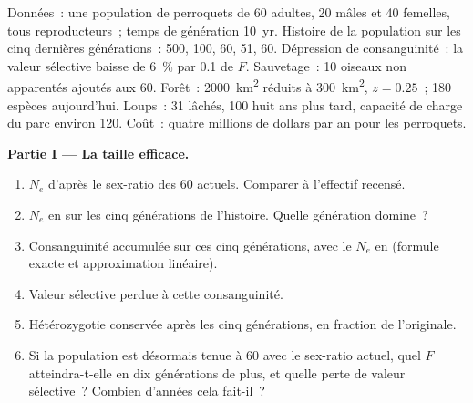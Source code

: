 \begin{problem}
\label{pb:b3:conservation-biology:1}
Données~: une population de perroquets de 60 adultes, 20 mâles et 40
femelles, tous reproducteurs~; temps de génération \qty{10}{yr}.
Histoire de la population sur les cinq dernières générations~: 500, 100,
60, 51, 60. Dépression de consanguinité~: la valeur sélective baisse de
\qty{6}{\%} par \qty{0.1}{} de $F$. Sauvetage~: 10 oiseaux non apparentés
ajoutés aux 60. Forêt~: \qty{2000}{km^2} réduits à \qty{300}{km^2},
$z = 0.25$~; 180 espèces aujourd'hui. Loups~: 31 lâchés, 100 huit ans
plus tard, capacité de charge du parc environ 120. Coût~: quatre
millions de dollars par an pour les perroquets.

\medskip
\noindent\textbf{Partie I --- La taille efficace.}
\begin{enumerate}
  \item $N_{e}$ d'après le sex-ratio des 60 actuels. Comparer à
        l'effectif recensé.
  \item $N_{e}$ en  sur les cinq générations de
        l'histoire. Quelle génération domine~?
  \item Consanguinité accumulée sur ces cinq générations, avec le
        $N_{e}$ en  (formule exacte et approximation
        linéaire).
  \item Valeur sélective perdue à cette consanguinité.
  \item Hétérozygotie conservée après les cinq générations, en fraction
        de l'originale.
  \item Si la population est désormais tenue à 60 avec le sex-ratio
        actuel, quel $F$ atteindra-t-elle en dix générations de plus, et
        quelle perte de valeur sélective~? Combien d'années cela fait-il~?
\end{enumerate}


\end{problem}
